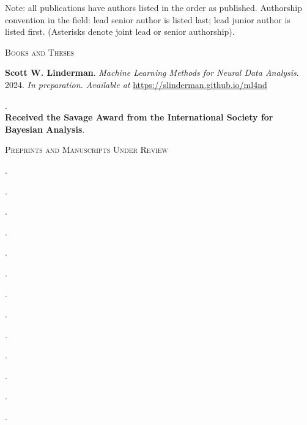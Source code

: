 \documentclass[10pt]{article}
\begin{document}
Note: all publications have authors listed in the order as published. Authorship convention in the field: lead senior author is listed last; lead junior author is listed first. (Asterisks denote joint lead or senior authorship).

\vspace{.5em}

{\small\scshape Books and Theses}
\begin{outerlist}
\item \textbf{Scott W. Linderman}. \textit{Machine Learning Methods for Neural Data Analysis}. 2024. \textit{In preparation. Available at} \url{https://slinderman.github.io/ml4nd}
\item {}. \\
  \textbf{Received the Savage Award from the International Society for Bayesian Analysis}. 
\end{outerlist}

\vspace{0.5em}

{\small\scshape Preprints and Manuscripts Under Review}
\begin{outerlist}
\item {}.
\item {}.
\item {}.
\item {}.
\item {}.
\item {}.
\item {}.
\item {}.
\item {}.
\item {}.
\item {}.
\item {}.
\item {}.
\end{outerlist}
\end{document}
